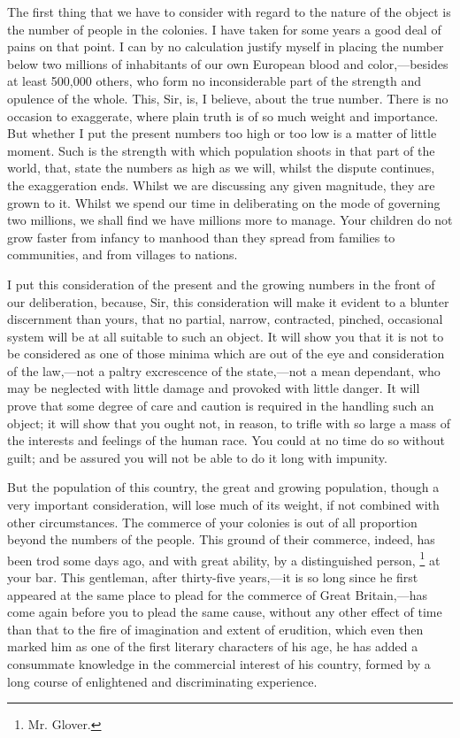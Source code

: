 The first thing that we have to consider with regard to the nature of the object is the number of people in the colonies. I have taken for some years a good deal of pains on that point. I can by no calculation justify myself in placing the number below two millions of inhabitants of our own European blood and color,—besides at least 500,000 others, who form no inconsiderable part of the strength and opulence of the whole. This, Sir, is, I believe, about the true number. There is no occasion to exaggerate, where plain truth is of so much weight and importance. But whether I put the present numbers too high or too low is a matter of little moment. Such is the strength with which population shoots in that part of the world, that, state the numbers as high as we will, whilst the dispute continues, the exaggeration ends. Whilst we are discussing any given magnitude, they are grown to it. Whilst we spend our time in deliberating on the mode of governing two millions, we shall find we have millions more to manage. Your children do not grow faster from infancy to manhood than they spread from families to communities, and from villages to nations.

I put this consideration of the present and the growing numbers in the front of our deliberation, because, Sir, this consideration will make it evident to a blunter discernment than yours, that no partial, narrow, contracted, pinched, occasional system will be at all suitable to such an object. It will show you that it is not to be considered as one of those minima which are out of the eye and consideration of the law,—not a paltry excrescence of the state,—not a mean dependant, who may be neglected with little damage and provoked with little danger. It will prove that some degree of care and caution is required in the handling such an object; it will show that you ought not, in reason, to trifle with so large a mass of the interests and feelings of the human race. You could at no time do so without guilt; and be assured you will not be able to do it long with impunity.

But the population of this country, the great and growing population, though a very important consideration, will lose much of its weight, if not combined with other circumstances. The commerce of your colonies is out of all proportion beyond the numbers of the people. This ground of their commerce, indeed, has been trod some days ago, and with great ability, by a distinguished person,
\footnote{Mr. Glover.}
at your bar. This gentleman, after thirty-five years,—it is so long since he first appeared at the same place to plead for the commerce of Great Britain,—has come again before you to plead the same cause, without any other effect of time than that to the fire of imagination and extent of erudition, which even then marked him as one of the first literary characters of his age, he has added a consummate knowledge in the commercial interest of his country, formed by a long course of enlightened and discriminating experience.

